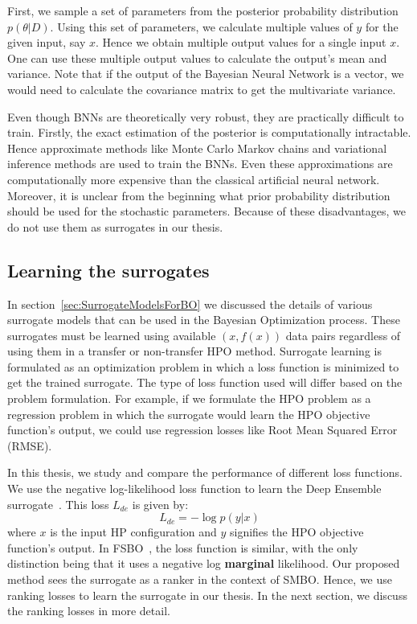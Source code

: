 \documentclass[12pt, twoside, ngerman]{report}
\begin{document}
First, we sample a set of parameters from the posterior probability distribution $p(\theta | D)$.
Using this set of parameters, we calculate multiple values of $y$ for the given input, say $x$.
Hence we obtain multiple output values for a single input $x$.
One can use these multiple output values to calculate the output's mean and variance.
Note that if the output of the Bayesian Neural Network is a vector, we would need to calculate the covariance matrix to get the multivariate variance.

Even though BNNs are theoretically very robust, they are practically difficult to train.
Firstly,  the exact estimation of the posterior is computationally intractable.
Hence approximate methods like Monte Carlo Markov chains and variational inference methods are used to train the BNNs.
Even these approximations are computationally more expensive than the classical artificial neural network.
Moreover,  it is unclear from the beginning what prior probability distribution should be used for the stochastic parameters.
Because of these disadvantages, we do not use them as surrogates in our thesis.

\subsection{Learning the surrogates}
In section~\ref{sec:SurrogateModelsForBO} we discussed the details of various surrogate models that can be used in the Bayesian Optimization process. These surrogates must be learned using available $(x, f(x))$  data pairs regardless of using them in a transfer or non-transfer HPO method. Surrogate learning is formulated as an optimization problem in which a loss function is minimized to get the trained surrogate.
The type of loss function used will differ based on the problem formulation. For example, if we formulate the HPO problem as a regression problem in which the surrogate would learn the HPO objective function's output, we could use regression losses like Root Mean Squared Error (RMSE).

In this thesis, we study and compare the performance of different loss functions. We use the negative log-likelihood loss function to learn the Deep Ensemble surrogate~\cite{DeepEnsemblePaper}. This loss $L_{de}$ is given by:
\begin{equation}
L_{de} = -\log p(y|x)
\end{equation}
where $x$ is the input HP configuration and $y$ signifies the HPO objective function's output.
In FSBO~\cite{fsbopaper}, the loss function is similar, with the only distinction being that it uses a negative log \textbf{marginal} likelihood.
Our proposed method sees the surrogate as a ranker in the context of SMBO. Hence, we use ranking losses to learn the surrogate in our thesis. In the next section, we discuss the ranking losses in more detail.
\end{document}

